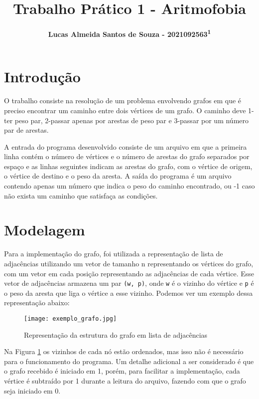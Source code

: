 \documentclass[12pt]{article}
\title{\textbf{Trabalho Prático 1 - Aritmofobia}}
\author{\textbf{Lucas Almeida Santos de Souza - 2021092563\textsuperscript{1}}}
\date{\parbox{\linewidth}{\centering%
	\textsuperscript{1}Universidade Federal de Minas Gerais (UFMG)\endgraf
	Belo Horizonte - MG - Brasil\endgraf\bigskip
	\href{mailto:luscaxalmeidass@ufmg.br}{luscaxalmeidass@ufmg.br}}}
\begin{document}
\maketitle


\section{Introdução}

	\par O trabalho consiste na resolução de um problema envolvendo grafos em que é preciso encontrar um caminho entre dois vértices de um grafo. O caminho deve 1-ter peso par, 2-passar apenas por arestas de peso par e 3-passar por um número par de arestas.

	\par A entrada do programa desenvolvido consiste de um arquivo em que a primeira linha contém o número de vértices e o número de arestas do grafo separados por espaço e as linhas seguintes indicam as arestas do grafo, com o vértice de origem, o vértice de destino e o peso da aresta. A saída do programa é um arquivo contendo apenas um número que indica o peso do caminho encontrado, ou -1 caso não exista um caminho que satisfaça as condições.

\section{Modelagem}

	\par Para a implementação do grafo, foi utilizada a representação de lista de adjacências utilizando um vetor de tamanho n representando os vértices do grafo, com um vetor em cada posição representando as adjacências de cada vértice. Esse vetor de adjacências armazena um par \texttt{(w, p)}, onde \texttt{w} é o vizinho do vértice e \texttt{p} é o peso da aresta que liga o vértice a esse vizinho. Podemos ver um exemplo dessa representação abaixo:

	\begin{figure}[H]
		\centering
		\texttt{[image: exemplo\_grafo.jpg]}
		\caption{Representação da estrutura do grafo em lista de adjacências}
		\label{exemplo_grafo}
	\end{figure}

	\par Na Figura \ref{exemplo_grafo} os vizinhos de cada nó estão ordenados, mas isso não é necessário para o funcionamento do programa. Um detalhe adicional a ser considerado é que o grafo recebido é iniciado em 1, porém, para facilitar a implementação, cada vértice é subtraído por 1 durante a leitura do arquivo, fazendo com que o grafo seja iniciado em 0.
\end{document}
